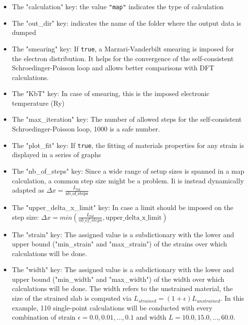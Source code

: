 \documentclass[a4paper,12pt]{article}
\begin{document}
\begin{itemize}
\item The "calculation" key: the value \texttt{"map"} indicates the type of calculation

\item The "out\_dir" key: indicates the name of the folder where the output data is dumped

\item The "smearing" key: If \texttt{true}, a Marzari-Vanderbilt smearing is imposed for the electron distribution. It helps for the convergence of the self-consistent Schroedinger-Poisson loop and allows better comparisons with DFT calculations.

\item The "KbT" key: In case of smearing, this is the imposed electronic temperature (Ry)

\item The "max\_iteration" key: The number of allowed steps for the self-consistent Schroedinger-Poisson loop, 1000 is a safe number.

\item The "plot\_fit" key: If \texttt{true}, the fitting of materials properties for any strain is displayed in a series of graphs

\item The "nb\_of\_steps" key: Since a wide range of setup sizes is spanned in a map calculation, a common step size might be a problem. Ii is instead dynamically adapted as $\Delta x = \frac{L_{tot}}{\text{nb\_of\_steps}}$

\item The "upper\_delta\_x\_limit" key: In case a limit should be imposed on the step size: $\Delta x = min(\frac{L_{tot}}{nb\_of
\_steps}, \text{upper\_delta\_x\_limit})$

\item The "strain" key: The assigned value is a subdictionary with the lower and upper bound ("min\_strain" and "max\_strain") of the strains over which calculations will be done. 

\item The "width" key: The assigned value is a subdictionary with the lower and upper bound ("min\_width" and "max\_width") of the width over which calculations will be done. The width refers to the unstrained material, the size of the strained slab is computed via $L_{strained} = (1+\epsilon)L_{unstrained}$. In this example, 110 single-point calculations will be conducted with every combination of strain $\epsilon = 0.0, 0.01,...,0.1$ and width $L = 10.0, 15.0,..., 60.0$.


\end{itemize}
\end{document}
